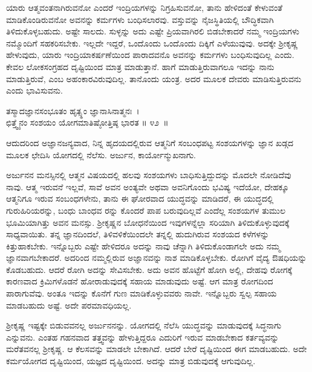 ಯಾರು ಆತ್ಮವಂತನಾಗಿರುವನೋ ಎಂದರೆ ಇಂದ್ರಿಯಗಳನ್ನು ನಿಗ್ರಹಿಸುವನೋ, ತಾನು ಹೇಳಿದಂತೆ ಕೇಳುವಂತೆ ಮಾಡಿಕೊಂಡಿರುವನೋ ಅವನನ್ನು ಕರ್ಮಗಳು ಬಂಧಿಸಲಾರವು. ವಸ್ತುವನ್ನು ನೈಜಸ್ಥಿತಿಯಲ್ಲಿ ಬೌದ್ಧಿಕವಾಗಿ ತಿಳಿದುಕೊಳ್ಳಬಹುದು. ಅಷ್ಟೇ ಸಾಲದು. ಸುಳ್ಳನ್ನು ಅದು ಎಷ್ಟೇ ಪ್ರಿಯವಾಗಿರಲಿ ಬಿಡಬೇಕಾದರೆ ನಮ್ಮ ಇಂದ್ರಿಯಗಳು ನಮ್ಮೊಂದಿಗೆ ಸಹಕರಿಸಬೇಕು. ಇಲ್ಲದೇ ಇದ್ದರೆ, ಒಂದೊಂದು ಒಂದೊಂದು ದಿಕ್ಕಿಗೆ ಎಳೆಯುವುವು. ಅದಕ್ಕೇ ಶ‍್ರೀಕೃಷ್ಣ ಹೇಳುವುದು, ಯಾರು ಇಂದ್ರಿಯಾಕರ್ಷಣೆಯಿಂದ ಪಾರಾದವನೊ ಅವನನ್ನು ಕರ್ಮಗಳು ಬಂಧಿಸುವುದಿಲ್ಲ ಎಂದು. ಕೇವಲ ಲೋಕಸಂಗ್ರಹದ ದೃಷ್ಟಿಯಿಂದ ಮಾತ್ರ ಮಾಡುತ್ತಾನೆ. ಹಾಗೆ ಮಾಡುತ್ತಿರುವಾಗಲೂ ಇದನ್ನು ನಾನು ಮಾಡುತ್ತಿರುವೆ, ಎಂಬ ಅಹಂಕಾರವಿರುವುದಿಲ್ಲ. ತಾನೊಂದು ಯಂತ್ರ. ಅದರ ಮೂಲಕ ದೇವರು ಮಾಡಿಸುತ್ತಿರುವನು ಎಂದು ಭಾವಿಸುವನು.

\begin{shloka}
ತಸ್ಮಾದಜ್ಞಾನಸಂಭೂತಂ ಹೃತ್ಸ್ಥಂ ಜ್ಞಾನಾಸಿನಾತ್ಮನಃ~।\\ಛಿತ್ತ್ವೈನಂ ಸಂಶಯಂ ಯೋಗಮಾತಿಷ್ಠೋತ್ತಿಷ್ಠ ಭಾರತ \hfill॥ ೪೨~॥
\end{shloka}

\begin{artha}
ಆದುದರಿಂದ ಅಜ್ಞಾನಜನ್ಯವಾದ, ನಿನ್ನ ಹೃದಯದಲ್ಲಿರುವ ಆತ್ಮನಿಗೆ ಸಂಬಂಧಪಟ್ಟ ಸಂಶಯಗಳನ್ನು ಜ್ಞಾನ ಖಡ್ಗದ ಮೂಲಕ ಛೇದಿಸಿ ಯೋಗದಲ್ಲಿ ನೆಲೆಸು. ಅರ್ಜುನ, ಕಾರ್ಯೋನ್ಮುಖನಾಗು.
\end{artha}

ಅರ್ಜುನನ ಮನಸ್ಸಿನಲ್ಲಿ ಆತ್ಮನ ವಿಷಯದಲ್ಲಿ ಹಲವು ಸಂಶಯಗಳು ಬಾಧಿಸುತ್ತಿದ್ದುದನ್ನು ಮೊದಲೇ ನೋಡಿದೆವು ನಾವು. ಆತ್ಮ ಇರುವನೆ ಇಲ್ಲವೆ, ಸಾವೆ ಅವನ ಅಂತ್ಯವೇ ಅಥವಾ ಅವನಿಗೊಂದು ಭವಿಷ್ಯ ಇದೆಯೋ, ದೇಹಕ್ಕೂ ಆತ್ಮನಿಗೂ ಇರುವ ಸಂಬಂಧಗಳೇನು, ತಾನು ಈ ಘೋರವಾದ ಯುದ್ಧವನ್ನು ಮಾಡಿದರೆ, ಈ ಯುದ್ಧದಲ್ಲಿ ಗುರುಹಿರಿಯರನ್ನು, ಬಂಧು ಬಾಂಧವ ರನ್ನು ಕೊಂದರೆ ಪಾಪ ಬರುವುದಿಲ್ಲವೆ ಎಂದೆಲ್ಲ ಸಂಶಯಗಳ ತುಮುಲ ಭೂಮಿಯಾಗಿತ್ತು ಅವನ ಮನಸ್ಸು. ಶ‍್ರೀಕೃಷ್ಣನ ಬೋಧನೆಯಿಂದ ಇವುಗಳನ್ನೆಲ್ಲಾ ಸರಿಯಾಗಿ ತಿಳಿದುಕೊಳ್ಳುವುದಕ್ಕೆ ಸಾಧ್ಯವಾಯಿತು. ತನ್ನ ಜ್ಞಾನದಿಂದಲೆ, ತಿಳಿವಳಿಕೆಯಿಂದಲೇ ತನ್ನಲ್ಲಿ ಹುದುಗಿರುವ ಸಂಶಯದ ಕಳೆಗಳನ್ನು ಕಿತ್ತುಹಾಕಬೇಕು. ಇನ್ನೊಬ್ಬರು ಎಷ್ಟೇ ಹೇಳಿದರೂ ಅದನ್ನು ನಾವು ಚೆನ್ನಾಗಿ ತಿಳಿದು\-ಕೊಂಡಾಗಲೇ ಅದು ನಮ್ಮ ಜ್ಞಾನವಾಗಬೇಕಾದರೆ. ಅದರಿಂದ ನಮ್ಮಲ್ಲಿರುವ ಅಜ್ಞಾನವನ್ನು ನಾಶ ಮಾಡಿಕೊಳ್ಳಬೇಕು. ರೋಗಿಗೆ ವೈದ್ಯ ಔಷಧಿಯನ್ನು ಕೊಡಬಹುದು. ಆದರೆ ರೋಗಿ ಅದನ್ನು ಸೇವಿಸಬೇಕು. ಅದು ಅವನ ಹೊಟ್ಟೆಗೆ ಹೋಗಿ ಅಲ್ಲಿ, ದೇಹವು ರೋಗಕ್ಕೆ ಕಾರಣವಾದ ಕ್ರಿಮಿಗಳೊಡನೆ ಹೋರಾಡುವುದಕ್ಕೆ ಸಹಾಯ ಮಾಡುವುದು ಅಷ್ಟೆ. ಆಗ ಮಾತ್ರ ರೋಗದಿಂದ ಪಾರಾಗುವೆವು. ಅಂತೂ ಇದನ್ನು ಕೊನೆಗೆ ಗುಣ ಮಾಡಿಕೊಳ್ಳುವವರು ನಾವೇ. ಇನ್ನೊಬ್ಬರು ಸ್ವಲ್ಪ ಸಹಾಯ ಮಾಡಬಹುದು ಅಷ್ಟೆ. ಅದೇ ಪರಮಾವಧಿಯಲ್ಲ.

ಶ‍್ರೀಕೃಷ್ಣ ಇಷ್ಟಕ್ಕೇ ಬಿಡುವವನಲ್ಲ ಅರ್ಜುನನನ್ನು. ಯೋಗದಲ್ಲಿ ನೆಲೆಸಿ ಯುದ್ಧವನ್ನು ಮಾಡುವುದಕ್ಕೆ ಸಿದ್ಧನಾಗು ಎನ್ನುವನು. ಎಂತಹ ಗಹನವಾದ ತತ್ತ್ವವನ್ನು ಹೇಳುತ್ತಿದ್ದರೂ ಎದುರಿಗೆ ಇರುವ ಮಾಡಬೇಕಾದ ಕರ್ತವ್ಯವನ್ನು ಮರೆತವನಲ್ಲ ಶ‍್ರೀಕೃಷ್ಣ. ಆ ಕೆಲಸವನ್ನು ಮಾಡಲೇ ಬೇಕಾಗಿದೆ. ಆದರೆ ಬೇರೆ ದೃಷ್ಟಿಯಿಂದ ಈಗ ಮಾಡಬಹುದು. ಅದೇ ಕರ್ಮಯೋಗದ ದೃಷ್ಟಿಯಿಂದ, ಯಜ್ಞದ ದೃಷ್ಟಿಯಿಂದ. ಅದನ್ನು ಮಾತ್ರ ಬಿಡುವುದಕ್ಕೆ ಆಗುವುದಿಲ್ಲ.

